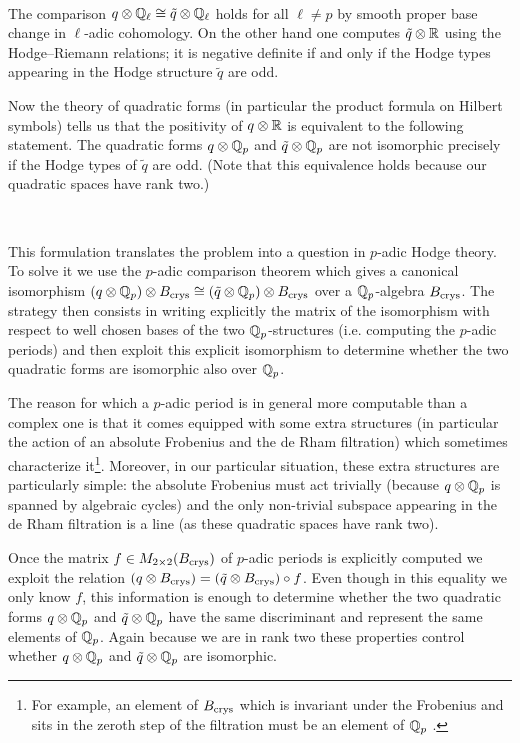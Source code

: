 \

The comparison  $q \otimes \mathbb{Q}_\ell \cong \tilde{q}\otimes \mathbb{Q}_\ell$ holds for all $\ell \neq p$   by smooth proper base change in $\ell$-adic cohomology.  On the other hand one computes $\tilde{q} \otimes \mathbb{R}$ using the Hodge--Riemann relations; it is negative definite if and only if the Hodge types appearing in the Hodge structure $\tilde{q}$ are odd.

Now the theory of quadratic forms (in particular the product formula on Hilbert symbols) tells us that the positivity of $q \otimes \mathbb{R}$ is equivalent to the following statement. The quadratic forms $q \otimes \mathbb{Q}_p $ and $\tilde{q}\otimes \mathbb{Q}_p$ are   not isomorphic  precisely   if the Hodge types of $\tilde{q}$ are odd. (Note that this equivalence holds because our quadratic spaces have rank two.)

\

This formulation translates the  problem into a question in $p$-adic Hodge theory. To solve it we use the $p$-adic comparison theorem which gives a canonical isomorphism $(q\otimes \mathbb{Q}_p) \otimes B_{\textnormal{crys}} \cong (\tilde{q}\otimes \mathbb{Q}_p) \otimes B_{\textnormal{crys}}$ over a   $\mathbb{Q}_p$-algebra $B_{\textnormal{crys}}$. The strategy then consists in  writing explicitly the matrix of the isomorphism with respect to  well chosen bases of the two $\mathbb{Q}_p$-structures (i.e. computing the $p$-adic periods) and then exploit this explicit isomorphism to determine whether the two quadratic forms are  isomorphic also over $\mathbb{Q}_p$.

The reason for which  a $p$-adic period is in general more computable than a complex one is that it comes equipped with some extra structures (in particular the action of an absolute Frobenius and the de Rham filtration) which sometimes characterize it\footnote{For example, an element of $B_{\textnormal{crys}}$ which is invariant under the Frobenius and sits in the zeroth step  of the filtration must be an element of $\mathbb{Q}_p$  \cite[Theorem 5.3.7]{Fontp}.}. Moreover, in our particular situation, these extra structures are particularly simple: the absolute Frobenius must act trivially (because $q\otimes \mathbb{Q}_p$ is spanned by algebraic cycles) and the only non-trivial subspace appearing in the de Rham filtration is a line (as these quadratic spaces have rank two).

Once   the matrix $f \in M_{2 \times 2} (B_{\textnormal{crys}})$ of $p$-adic periods is explicitly computed we exploit the relation $(q\otimes B_{\textnormal{crys}})=  (\tilde{q}\otimes B_{\textnormal{crys}}) \circ f$. Even though in this equality we only know $f$, this information is enough to determine whether the two quadratic forms  $q\otimes \mathbb{Q}_p$ and $\tilde{q}\otimes \mathbb{Q}_p$ have the same discriminant and represent the same elements of $\mathbb{Q}_p$. Again because we are in rank two these properties control whether  $q\otimes \mathbb{Q}_p$ and $\tilde{q}\otimes \mathbb{Q}_p$ are isomorphic.


